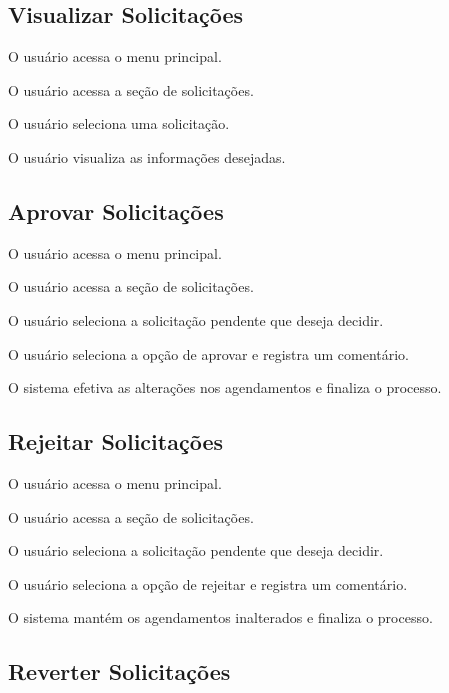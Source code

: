 \documentclass[12pt,a4paper]{article}
\begin{document}
\subsection{Visualizar Solicitações}

\begin{fluxo}
  \item O usuário acessa o menu principal.
  \item O usuário acessa a seção de solicitações.
  \item O usuário seleciona uma solicitação.
  \item O usuário visualiza as informações desejadas.
\end{fluxo}

\subsection{Aprovar Solicitações}

\begin{fluxo}
  \item O usuário acessa o menu principal.
  \item O usuário acessa a seção de solicitações.
  \item O usuário seleciona a solicitação pendente que deseja decidir.
  \item O usuário seleciona a opção de aprovar e registra um comentário.
  \item O sistema efetiva as alterações nos agendamentos e finaliza o processo.
\end{fluxo}

\subsection{Rejeitar Solicitações}

\begin{fluxo}
  \item O usuário acessa o menu principal.
  \item O usuário acessa a seção de solicitações.
  \item O usuário seleciona a solicitação pendente que deseja decidir.
  \item O usuário seleciona a opção de rejeitar e registra um comentário.
  \item O sistema mantém os agendamentos inalterados e finaliza o processo.
\end{fluxo}

\subsection{Reverter Solicitações}
\end{document}
